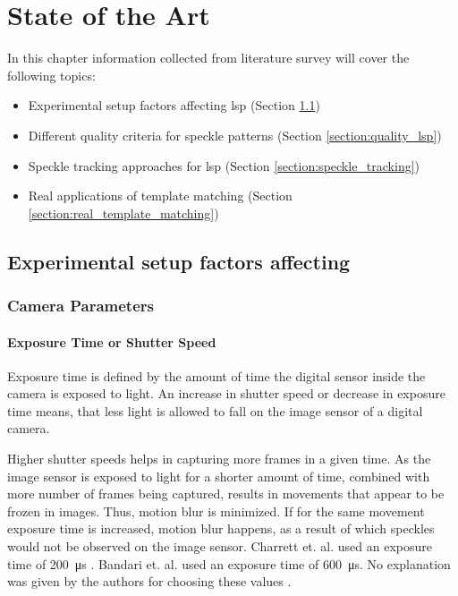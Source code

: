\chapter{State of the Art}\label{chapter:sota}
In this chapter information collected from literature survey will cover the following topics:

\begin{itemize}
    \item Experimental setup factors affecting \gls{lsp} (Section \ref{section:exp_factors})
    \item Different quality criteria for speckle patterns (Section \ref{section:quality_lsp})
    \item Speckle tracking approaches for \gls{lsp} (Section \ref{section:speckle_tracking})
    \item Real applications of template matching (Section \ref{section:real_template_matching})
\end{itemize}

\section{Experimental setup factors affecting }\label{section:exp_factors}

\subsection{Camera Parameters}

    \subsubsection{Exposure Time or Shutter Speed}\label{Subsubsection:Exposure_Time}
    Exposure time is defined by the amount of time the digital sensor inside the camera is exposed to light. An increase in shutter speed or decrease in exposure time means, that less light is allowed to fall on the image sensor of a digital camera.

    \vspace{5mm}
    \noindent Higher shutter speeds helps in capturing more frames in a given time. As the image sensor is exposed to light for a shorter amount of time, combined with more number of frames being captured, results in movements that appear to be frozen in images. Thus, motion blur is minimized. If for the same movement exposure time is increased, motion blur happens, as a result of which speckles would not be observed on the image sensor. Charrett et. al.  used an exposure time of \SI{200}{\micro\second} \cite{charrett_2018}. Bandari et. al. used an exposure time of \SI{600}{\micro\second}. No explanation was given by the authors for choosing these values \cite{bandari}.

